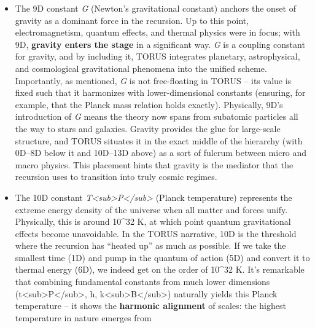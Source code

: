\documentclass[]{article}
\begin{document}
{\begin{itemize}
  a fundamental constant is ``purposeful: it ensures that the passage
  from microscopic to macroscopic is seamless''​. In other words, 8D
  marks the fully developed classical thermodynamics regime (PV = nRT,
  etc.), and having \emph{R} in the list explicitly acknowledges that
  the recursion has now reached the continuum limit of matter. It is a
  reassurance that what emerges at 8D is \emph{identical} to what we
  know from classical thermodynamics -- a continuity check.
\item
  The 9D constant \emph{G} (Newton's gravitational constant) anchors the
  onset of gravity as a dominant force in the recursion. Up to this
  point, electromagnetism, quantum effects, and thermal physics were in
  focus; with 9D, \textbf{gravity enters the stage} in a significant
  way. \emph{G} is a coupling constant for gravity, and by including it,
  TORUS integrates planetary, astrophysical, and cosmological
  gravitational phenomena into the unified scheme. Importantly, as
  mentioned, \emph{G} is not free-floating in TORUS -- its value is
  fixed such that it harmonizes with lower-dimensional constants
  (ensuring, for example, that the Planck mass relation holds exactly)​.
  Physically, 9D's introduction of \emph{G} means the theory now spans
  from subatomic particles all the way to stars and galaxies. Gravity
  provides the glue for large-scale structure, and TORUS situates it in
  the exact middle of the hierarchy (with 0D--8D below it and 10D--13D
  above) as a sort of fulcrum between micro and macro physics. This
  placement hints that gravity is the mediator that the recursion uses
  to transition into truly cosmic regimes.
\item
  The 10D constant
  \emph{T\textless{}sub\textgreater{}P\textless{}/sub\textgreater{}}
  (Planck temperature) represents the extreme energy density of the
  universe when all matter and forces unify. Physically, this is around
  10\^{}32 K, at which point quantum gravitational effects become
  unavoidable. In the TORUS narrative, 10D is the threshold where the
  recursion has ``heated up'' as much as possible​. If we take the
  smallest time (1D) and pump in the quantum of action (5D) and convert
  it to thermal energy (6D), we indeed get on the order of 10\^{}32 K​.
  It's remarkable that combining fundamental constants from much lower
  dimensions
  (t\textless{}sub\textgreater{}P\textless{}/sub\textgreater{}, h,
  k\textless{}sub\textgreater{}B\textless{}/sub\textgreater{}) naturally
  yields this Planck temperature -- it shows the \textbf{harmonic
  alignment} of scales: the highest temperature in nature emerges from

\end{itemize}}
\end{document}
